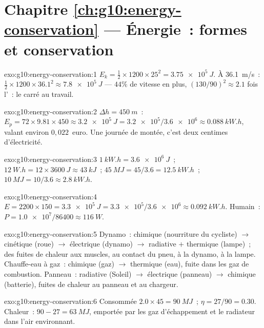 \section*{Chapitre \ref{ch:g10:energy-conservation} --- Énergie~: formes et conservation}

\begin{solution}{exo:g10:energy-conservation:1}
$E_k = \tfrac12 \times 1200 \times 25^2 = \qty{3.75e5}{J}$. À
\qty{36.1}{m/s}~: $\tfrac12 \times 1200 \times 36.1^2 \approx
\qty{7.8e5}{J}$ --- $44\%$ de vitesse en plus, $(130/90)^2 \approx 2.1$
fois l'~: le carré au travail.
\end{solution}

\begin{solution}{exo:g10:energy-conservation:2}
$\Delta h = \qty{450}{m}$~:
$E_p = 72 \times 9.81 \times 450 \approx \qty{3.2e5}{J}
= \num{3.2e5}/\num{3.6e6} \approx \qty{0.088}{kW.h}$, valant environ
$0{,}022$~euro. Une journée de montée, c'est deux centimes
d'électricité.
\end{solution}

\begin{solution}{exo:g10:energy-conservation:3}
$\qty{1}{kW.h} = \qty{3.6e6}{J}$~;
$\qty{12}{W.h} = 12 \times \qty{3600}{J} \approx \qty{43}{kJ}$~;
$\qty{45}{MJ} = 45/3.6 = \qty{12.5}{kW.h}$~;
$\qty{10}{MJ} = 10/3.6 \approx \qty{2.8}{kW.h}$.
\end{solution}

\begin{solution}{exo:g10:energy-conservation:4}
$E = 2200 \times 150 = \qty{3.3e5}{J}
= \num{3.3e5}/\num{3.6e6} \approx \qty{0.092}{kW.h}$. Humain~:
$P = \num{1.0e7}/\num{86400} \approx \qty{116}{W}$.
\end{solution}

\begin{solution}{exo:g10:energy-conservation:5}
Dynamo~: chimique (nourriture du cycliste) $\to$ cinétique (roue)
$\to$ électrique (dynamo) $\to$ radiative $+$ thermique (lampe)~; des
fuites de chaleur aux muscles, au contact du pneu, à la dynamo, à la
lampe. Chauffe-eau à gaz~: chimique (gaz) $\to$ thermique (eau), fuite
dans les gaz de combustion. Panneau~: radiative (Soleil) $\to$
électrique (panneau) $\to$ chimique (batterie), fuites de chaleur au
panneau et au chargeur.
\end{solution}

\begin{solution}{exo:g10:energy-conservation:6}
Consommée $2.0 \times 45 = \qty{90}{MJ}$~; $\eta = 27/90 = 0.30$.
Chaleur~: $90 - 27 = \qty{63}{MJ}$, emportée par les gaz d'échappement
et le radiateur dans l'air environnant.
\end{solution}

